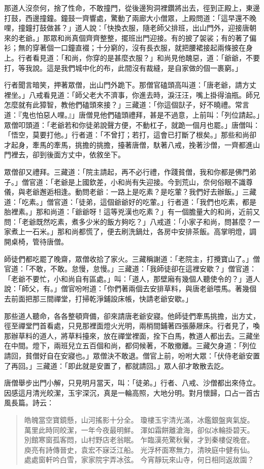 那道人沒奈何，捨了性命，不敢撞門，從後邊狗洞裡鑽將出去，徑到正殿上，東邊打鼓，西邊撞鐘。鐘鼓一齊響處，驚動了兩廊大小僧眾，上殿問道：「這早還不晚哩，撞鐘打鼓做甚？」道人說：「快換衣服，隨老師父排班，出山門外，迎接唐朝來的老爺。」那眾和尚真個齊齊整整，擺班出門迎接。有的披了袈裟；有的著了偏衫；無的穿著個一口鐘直裰；十分窮的，沒有長衣服，就把腰裙接起兩條披在身上。行者看見道：「和尚，你穿的是甚麼衣服？」和尚見他醜惡，道：「爺爺，不要打，等我說。這是我們城中化的布，此間沒有裁縫，是自家做的個一裹窮。」

行者聞言暗笑，押著眾僧，出山門外跪下。那僧官磕頭高叫道：「唐老爺，請方丈裡坐。」八戒看見道：「師父老大不濟事，你進去時，淚汪汪，嘴上掛得油瓶。師兄怎麼就有此獐智，教他們磕頭來接？」三藏道：「你這個獃子，好不曉禮。常言道：『鬼也怕惡人哩。』」唐僧見他們磕頭禮拜，甚是不過意，上前叫：「列位請起。」眾僧叩頭道：「老爺若和你徒弟說聲方便，不動杠子，就跪一個月也罷。」唐僧叫：「悟空，莫要打他。」行者道：「不曾打；若打，這會已打斷了根矣。」那些和尚卻才起身，牽馬的牽馬，挑擔的挑擔，擡著唐僧，馱著八戒，挽著沙僧，一齊都進山門裡去，卻到後面方丈中，依敘坐下。

眾僧卻又禮拜。三藏道：「院主請起，再不必行禮，作踐貧僧，我和你都是佛門弟子。」僧官道：「老爺是上國欽差，小和尚有失迎接。今到荒山，奈何俗眼不識尊儀，與老爺邂逅相逢。動問老爺：一路上是吃素？是吃葷？我們好去辦飯。」三藏道：「吃素。」僧官道：「徒弟，這個爺爺好的吃葷。」行者道：「我們也吃素，都是胎裡素。」那和尚道：「爺爺呀！這等兇漢也吃素？」有一個膽量大的和尚，近前又問：「老爺既然吃素，煮多少米的飯方夠吃？」八戒道：「小家子和尚，問甚麼？一家煮上一石米。」那和尚都慌了，便去刷洗鍋灶，各房中安排茶飯。高掌明燈，調開桌椅，管待唐僧。

師徒們都吃罷了晚齋，眾僧收拾了家火。三藏稱謝道：「老院主，打攪寶山了。」僧官道：「不敢，不敢。怠慢，怠慢。」三藏道：「我師徒卻在這裡安歇？」僧官道：「老爺不要忙，小和尚自有區處。」叫：「道人，那壁廂有幾個人聽使令的？」道人說：「師父，有。」僧官吩咐道：「你們著兩個去安排草料，與唐老爺喂馬。著幾個去前面把那三間禪堂，打掃乾淨鋪設床帳，快請老爺安歇。」

那些道人聽命，各各整頓齊備，卻來請唐老爺安寢。他師徒們牽馬挑擔，出方丈，徑至禪堂門首看處，只見那裡面燈火光明，兩梢間鋪著四張藤屜床。行者見了，喚那辦草料的道人，將草料擡來，放在禪堂裡面，拴下白馬，教道人都出去。三藏坐在中間。燈下，兩班兒立五百個和尚，都伺候著，不敢撤離。三藏欠身道：「列位請回，貧僧好自在安寢也。」眾僧決不敢退。僧官上前，吩咐大眾：「伏侍老爺安置了再回。」三藏道：「即此就是安置了，都就請回。」眾人卻才敢散去訖。

唐僧舉步出門小解，只見明月當天，叫：「徒弟。」行者、八戒、沙僧都出來侍立。因感這月清光皎潔，玉宇深沉，真是一輪高照，大地分明。對月懷歸，口占一首古風長篇。詩云：
\begin{quote}
皓魄當空寶鏡懸，山河搖影十分全。
瓊樓玉宇清光滿，冰鑑銀盤爽氣旋。
萬里此時同皎潔，一年今夜最明鮮。
渾如霜餅離滄海，卻似冰輪掛碧天。
別館寒窗孤客悶，山村野店老翁眠。
乍臨漢苑驚秋鬢，才到秦樓促晚奩。
庾亮有詩傳晉史，袁宏不寐泛江船。
光浮杯面寒無力，清映庭中健有仙。
處處窗軒吟白雪，家家院宇弄冰弦。
今宵靜玩來山寺，何日相同返故園？
\end{quote}

